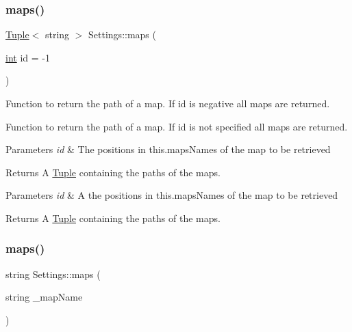 \subsubsection{\texorpdfstring{maps()}{maps()}\hspace{0.1cm}{\footnotesize\ttfamily [2/4]}}
{\footnotesize\ttfamily \mbox{\hyperlink{class_tuple}{Tuple}}$<$ string $>$ Settings\+::maps (\begin{DoxyParamCaption}\item[{\mbox{\hyperlink{draw_8hh_aa620a13339ac3a1177c86edc549fda9b}{int}}}]{id = {\ttfamily -\/1} }\end{DoxyParamCaption})}



Function to return the path of a map. If id is negative all maps are returned. 

Function to return the path of a map. If id is not specified all maps are returned.


\begin{DoxyParams}{Parameters}
{\em id} & The positions in this.\+maps\+Names of the map to be retrieved \\
\hline
\end{DoxyParams}
\begin{DoxyReturn}{Returns}
A \mbox{\hyperlink{class_tuple}{Tuple}} containing the paths of the maps.
\end{DoxyReturn}

\begin{DoxyParams}{Parameters}
{\em id} & A the positions in this.\+maps\+Names of the map to be retrieved \\
\hline
\end{DoxyParams}
\begin{DoxyReturn}{Returns}
A \mbox{\hyperlink{class_tuple}{Tuple}} containing the paths of the maps. 
\end{DoxyReturn}
\mbox{\label{class_settings_aa34e6004beffad1bc5fd81f99353d3e1}} 
\subsubsection{\texorpdfstring{maps()}{maps()}\hspace{0.1cm}{\footnotesize\ttfamily [3/4]}}
{\footnotesize\ttfamily string Settings\+::maps (\begin{DoxyParamCaption}\item[{string}]{\+\_\+map\+Name }\end{DoxyParamCaption})}



